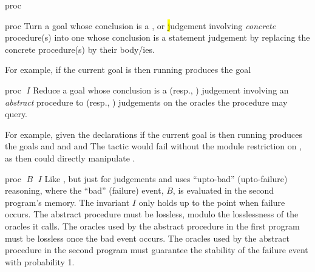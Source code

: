 \begin{tactic}{proc}
  \begin{tsyntax}{proc}
    Turn a goal whose conclusion is a \prhl, \phl or \hl judgement
    involving \emph{concrete} procedure(s) into one whose conclusion is
    a statement judgement by replacing the concrete procedure(s)
    by their body/ies.

  \bigskip
  For example, if the current goal is
   then
  running 
  produces the goal
  \end{tsyntax}

  \begin{tsyntax}{proc $\;I$}
    Reduce a goal whose conclusion is a \prhl (resp., \phl) judgement
    involving an \emph{abstract} procedure to \prhl (resp., \phl)
    judgements on the oracles the procedure may query.

  \bigskip
  For example, given the declarations
  if the current goal is
   then
  running 
  produces the goals
  and
  and
  and
  The tactic would fail without the module restriction  on
  , as then  could directly manipulate .
  \end{tsyntax}

  \begin{tsyntax}{proc $\;B$ $\;I$}
    Like , but just for \prhl judgements and uses
    ``upto-bad'' (upto-failure) reasoning, where the ``bad'' (failure)
    event, $B$, is evaluated in the second program's memory.  The
    invariant $I$ only holds up to the point when failure occurs. The
    abstract procedure must be lossless, modulo the losslessness of
    the oracles it calls.  The oracles used by the abstract procedure
    in the first program must be lossless once the bad event
    occurs. The oracles used by the abstract procedure in the second
    program must guarantee the stability of the failure event with
    probability 1.


\end{tsyntax}
\end{tactic}
